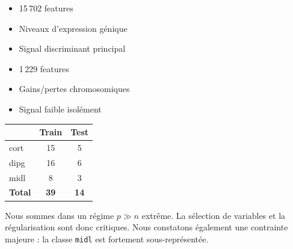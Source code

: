 \documentclass[a4paper,11pt]{paper}
\theoremstyle{plain}
\theoremstyle{definition}
\theoremstyle{remark}
\begin{document}
\begin{tcbitemize}[
        raster columns=2,
        raster equal height,
        raster column skip=1em,
        enhanced,
        boxrule=0.8pt,
        fonttitle=\bfseries\small,
        rounded corners,
        attach boxed title to top left,
        boxed title style={sharp corners, size=small}
    ]
    \tcbitem[
        title=Bloc GE (Gene Expression),
        colback=blue!5!white,
        colframe=blue!40!black,
        colbacktitle=blue!15!white,
        coltitle=blue!60!black
    ]
    \begin{itemize}
        \item 15\,702 features
        \item Niveaux d'expression génique
        \item Signal discriminant principal
    \end{itemize}

    \tcbitem[
        title=Bloc CGH (Altérations chromosomiques),
        colback=orange!8!white,
        colframe=orange!50!black,
        colbacktitle=orange!15!white,
        coltitle=orange!70!black
    ]
    \begin{itemize}
        \item 1\,229 features
        \item Gains/pertes chromosomiques
        \item Signal faible isolément
    \end{itemize}
\end{tcbitemize}

\vspace{1em}
\begin{center}
    \begin{tabular}{lcc}
        \toprule
                       & \textbf{Train} & \textbf{Test} \\
        \midrule
        cort           & 15             & 5             \\
        dipg           & 16             & 6             \\
        midl           & 8              & 3             \\
        \midrule
        \textbf{Total} & \textbf{39}    & \textbf{14}   \\
        \bottomrule
    \end{tabular}
\end{center}

Nous sommes dans un régime $p \gg n$ extrême. La sélection de variables et la régularisation sont donc critiques.
Nous constatons également une contrainte majeure : la classe \texttt{midl} est fortement sous-représentée.
\end{document}
